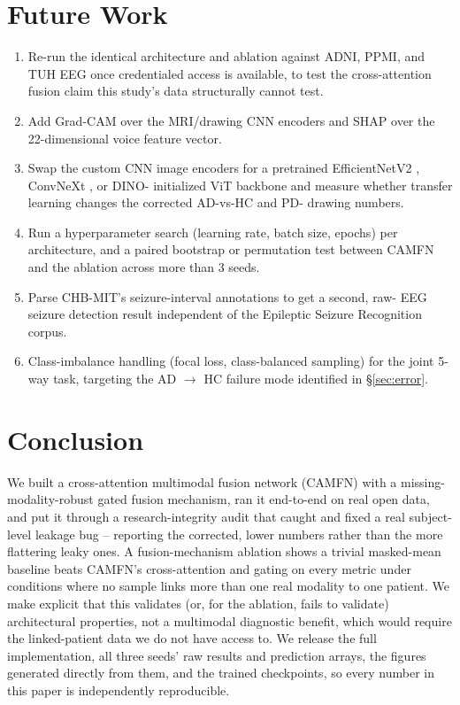 \documentclass[conference]{IEEEtran}
\begin{document}
\section{Future Work}
\label{sec:future}
\begin{enumerate}
\item Re-run the identical architecture and ablation against ADNI,
PPMI, and TUH EEG once credentialed access is available, to test the
cross-attention fusion claim this study's data structurally cannot test.
\item Add Grad-CAM over the MRI/drawing CNN encoders and SHAP over the
22-dimensional voice feature vector.
\item Swap the custom CNN image encoders for a pretrained EfficientNetV2
\cite{tan2021efficientnetv2}, ConvNeXt \cite{liu2022convnext}, or DINO-
initialized ViT \cite{caron2021dino,dosovitskiy2021vit} backbone and
measure whether transfer learning changes the corrected AD-vs-HC and PD-
drawing numbers.
\item Run a hyperparameter search (learning rate, batch size, epochs) per
architecture, and a paired bootstrap or permutation test between CAMFN
and the ablation across more than 3 seeds.
\item Parse CHB-MIT's seizure-interval annotations to get a second, raw-
EEG seizure detection result independent of the Epileptic Seizure
Recognition corpus.
\item Class-imbalance handling (focal loss, class-balanced sampling) for
the joint 5-way task, targeting the AD $\rightarrow$ HC failure mode
identified in \S\ref{sec:error}.
\end{enumerate}

\section{Conclusion}
\label{sec:conclusion}
We built a cross-attention multimodal fusion network (CAMFN) with a
missing-modality-robust gated fusion mechanism, ran it end-to-end on
real open data, and put it through a research-integrity audit that
caught and fixed a real subject-level leakage bug -- reporting the
corrected, lower numbers rather than the more flattering leaky ones. A
fusion-mechanism ablation shows a trivial masked-mean baseline beats
CAMFN's cross-attention and gating on every metric under conditions where
no sample links more than one real modality to one patient. We make
explicit that this validates (or, for the ablation, fails to validate)
architectural properties, not a multimodal diagnostic benefit, which
would require the linked-patient data we do not have access to. We
release the full implementation, all three seeds' raw results and
prediction arrays, the figures generated directly from them, and the
trained checkpoints, so every number in this paper is independently
reproducible.



\end{document}
